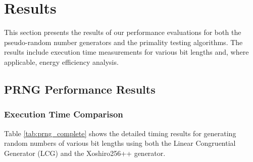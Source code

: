 \section{Results}

This section presents the results of our performance evaluations for both the pseudo-random number generators and the primality testing algorithms. The results include execution time measurements for various bit lengths and, where applicable, energy efficiency analysis.

\subsection{PRNG Performance Results}

\subsubsection{Execution Time Comparison}

Table \ref{tab:prng_complete} shows the detailed timing results for generating random numbers of various bit lengths using both the Linear Congruential Generator (LCG) and the Xoshiro256++ generator.


